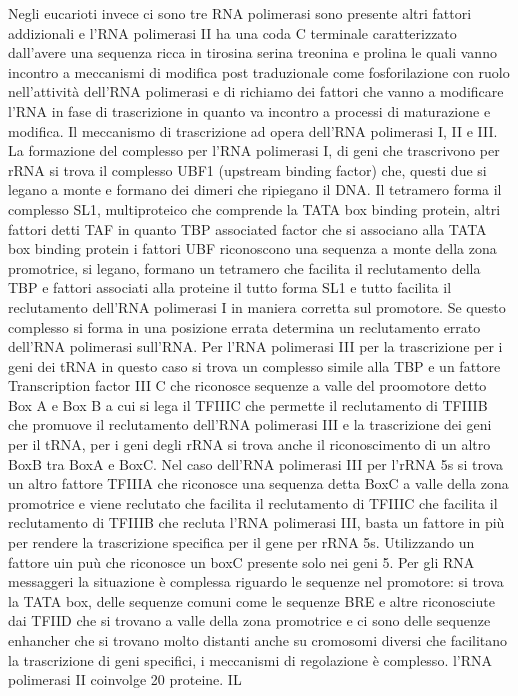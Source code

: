 Negli eucarioti invece ci sono tre RNA polimerasi sono presente altri fattori addizionali e l'RNA polimerasi II ha una coda C terminale caratterizzato dall'avere una sequenza ricca in
tirosina serina treonina e prolina le quali vanno incontro a meccanismi di modifica post traduzionale come fosforilazione con ruolo nell'attivit\`a dell'RNA polimerasi e di richiamo dei
fattori che vanno a modificare l'RNA in fase di trascrizione in quanto va incontro a processi di maturazione e modifica. Il meccanismo di trascrizione ad opera dell'RNA polimerasi I, II
e III. La formazione del complesso per l'RNA polimerasi I, di geni che trascrivono per rRNA si trova il complesso UBF1 (upstream binding factor) che, questi due si legano a monte e 
formano dei dimeri che ripiegano il DNA. Il tetramero forma il complesso SL1, multiproteico che comprende la TATA box binding protein, altri fattori detti TAF in quanto TBP associated 
factor che si associano alla TATA box binding protein i fattori UBF riconoscono una sequenza a monte della zona promotrice, si legano, formano un tetramero che facilita il reclutamento 
della TBP e fattori associati alla proteine il tutto forma SL1 e tutto facilita il reclutamento dell'RNA polimerasi I in maniera corretta sul promotore. Se questo complesso si forma in
una posizione errata determina un reclutamento errato dell'RNA polimerasi sull'RNA. Per l'RNA polimerasi III per la trascrizione per i geni dei tRNA in questo caso si trova un complesso
simile alla TBP e un fattore Transcription factor III C che riconosce sequenze a valle del proomotore detto Box A e Box B a cui si lega il TFIIIC che permette il reclutamento di TFIIIB
che promuove il reclutamento dell'RNA polimerasi III e la trascrizione dei geni per il tRNA, per i geni degli rRNA si trova anche il riconoscimento di un altro BoxB tra BoxA e BoxC. Nel
caso dell'RNA polimerasi III per l'rRNA 5s si trova un altro fattore TFIIIA che riconosce una sequenza detta BoxC a valle della zona promotrice e viene reclutato che facilita il 
reclutamento di TFIIIC che facilita il reclutamento di TFIIIB che recluta l'RNA polimerasi III, basta un fattore in pi\`u per rendere la trascrizione specifica per il gene per rRNA 5s. 
Utilizzando un fattore uin pu\`u che riconosce un boxC presente solo nei geni 5. Per gli RNA messaggeri la situazione \`e complessa riguardo le sequenze nel promotore: si trova la
TATA box, delle sequenze comuni come le sequenze BRE e altre riconosciute dai TFIID che si trovano a valle della zona promotrice e ci sono delle sequenze enhancher che si trovano 
molto distanti anche su cromosomi diversi che facilitano la trascrizione di geni specifici, i meccanismi di regolazione \`e complesso. l'RNA polimerasi II coinvolge 20 proteine. IL 
